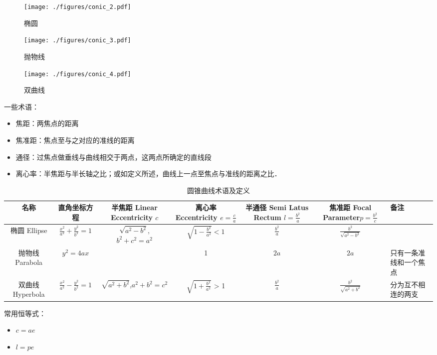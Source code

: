 \begin{figure}[ht]
\centering
\texttt{[image: ./figures/conic\_2.pdf]}
\caption{椭圆} \label{conic_fig2}
\end{figure}

\begin{figure}[ht]
\centering
\texttt{[image: ./figures/conic\_3.pdf]}
\caption{抛物线} \label{conic_fig3}
\end{figure}

\begin{figure}[ht]
\centering
\texttt{[image: ./figures/conic\_4.pdf]}
\caption{双曲线} \label{conic_fig4}
\end{figure}

一些术语：
\begin{itemize}
\item 焦距：两焦点的距离
\item 焦准距：焦点至与之对应的准线的距离
\item 通径：过焦点做垂线与曲线相交于两点，这两点所确定的直线段
\item 离心率：半焦距与半长轴之比；或如定义所述，曲线上一点至焦点与准线的距离之比．
\end{itemize}

\begin{table}[ht]
\centering
\caption{圆锥曲线术语及定义}\label{conic_tab1}
\begin{tabular}{|c|c|c|c|c|c|}
\hline
名称 & 直角坐标方程 & 半焦距 Linear Eccentricity $c$ & 离心率 Eccentricity $e = \frac{c}{a}$ & 半通径 Semi Latus Rectum $l=\frac{b^2}{a}$ & 焦准距 Focal Parameter$p=\frac{b^2}{c}$ & 备注\\
\hline
椭圆 Ellipse & $\frac{x^2}{a^2} + \frac{y^2}{b^2} = 1$ & $\sqrt{a^2-b^2}$, $b^2+c^2=a^2$ & $\sqrt{1-\frac{b^2}{a^2}} < 1$ & $\frac{b^2}{a}$ & $\frac{b^2}{\sqrt{a^2-b^2}}$ &  \\
\hline
抛物线 Parabola & $y^2=4ax$ & \ & 1 & $2a$ & $2a$ & 只有一条准线和一个焦点\\
\hline
双曲线 Hyperbola & $\frac{x^2}{a^2} - \frac{y^2}{b^2} = 1$ & $\sqrt{a^2+b^2}$,$a^2+b^2=c^2$ & $\sqrt{1+\frac{b^2}{a^2}}$ > 1 & $\frac{b^2}{a}$ & $\frac{b^2}{\sqrt{a^2+b^2}}$ & 分为互不相连的两支 \\
\hline
\end{tabular}
\end{table}

常用恒等式：
\begin{itemize}
\item $c=ae$
\item $l=pe$
\end{itemize}
